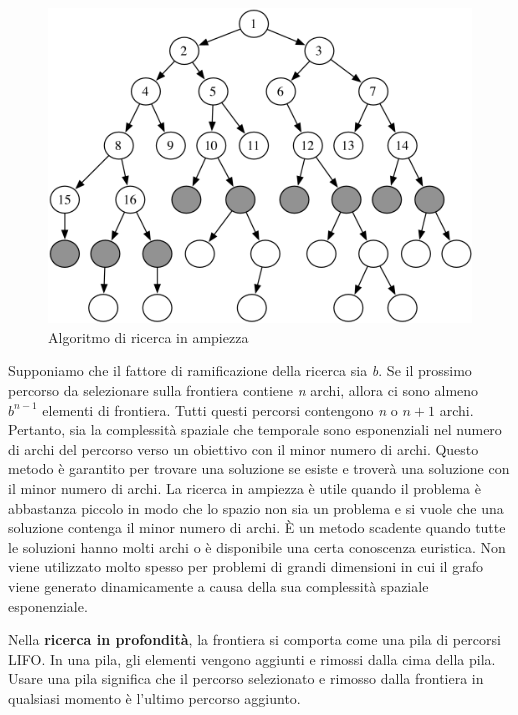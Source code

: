 \documentclass[a4paper]{extarticle}
\begin{document}
\begin{figure}[h!]
\begin{center}
\includegraphics[scale=0.5]{ricercaAmpiezza.png}
\caption{Algoritmo di ricerca in ampiezza}
\end{center}
\end{figure}

Supponiamo che il fattore di ramificazione della ricerca sia \textit{b}. Se il prossimo percorso da selezionare sulla frontiera contiene \textit{n} archi, allora ci sono almeno $b^{n-1}$ elementi di frontiera. Tutti questi percorsi contengono \textit{n} o $n+1$ archi. Pertanto, sia la complessità spaziale che temporale sono esponenziali nel numero di archi del percorso verso un obiettivo con il minor numero di archi. Questo metodo è garantito per trovare una soluzione se esiste e troverà una soluzione con il minor numero di archi. La ricerca in ampiezza è utile quando il problema è abbastanza piccolo in modo che lo spazio non sia un problema e si vuole che una soluzione contenga il minor numero di archi. È un metodo scadente quando tutte le soluzioni hanno molti archi o è disponibile una certa conoscenza euristica. Non viene utilizzato molto spesso per problemi di grandi dimensioni in cui il grafo viene generato dinamicamente a causa della sua complessità spaziale esponenziale.

Nella \textbf{ricerca in profondità}, la frontiera si comporta come una pila di percorsi LIFO. In una pila, gli elementi vengono aggiunti e rimossi dalla cima della pila. Usare una pila significa che il percorso selezionato e rimosso dalla frontiera in qualsiasi momento è l'ultimo percorso aggiunto.
\end{document}
